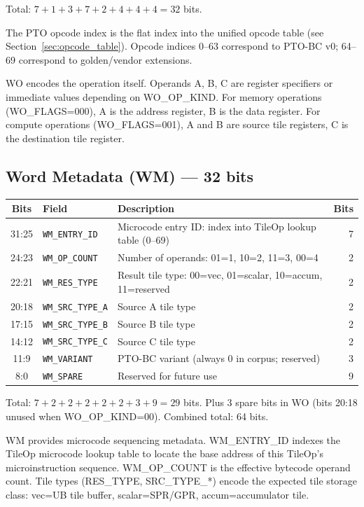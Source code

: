 Total: $7+1+3+7+2+4+4+4 = 32$ bits.

The PTO opcode index is the flat index into the unified opcode table (see Section~\ref{sec:opcode_table}). Opcode indices 0--63 correspond to PTO-BC v0; 64--69 correspond to golden/vendor extensions.

WO encodes the operation itself. Operands A, B, C are register specifiers or immediate values depending on WO\_OP\_KIND. For memory operations (WO\_FLAGS=000), A is the address register, B is the data register. For compute operations (WO\_FLAGS=001), A and B are source tile registers, C is the destination tile register.

\subsection{Word Metadata (WM) --- 32 bits}

\begin{center}
\begin{tabular}{cllr}
\toprule
Bits & Field & Description & Bits \\
\midrule
31:25 & \texttt{WM\_ENTRY\_ID} & Microcode entry ID: index into TileOp lookup table (0--69) & 7 \\
24:23 & \texttt{WM\_OP\_COUNT} & Number of operands: 01=1, 10=2, 11=3, 00=4 & 2 \\
22:21 & \texttt{WM\_RES\_TYPE} & Result tile type: 00=vec, 01=scalar, 10=accum, 11=reserved & 2 \\
20:18 & \texttt{WM\_SRC\_TYPE\_A} & Source A tile type & 2 \\
17:15 & \texttt{WM\_SRC\_TYPE\_B} & Source B tile type & 2 \\
14:12 & \texttt{WM\_SRC\_TYPE\_C} & Source C tile type & 2 \\
11:9 & \texttt{WM\_VARIANT} & PTO-BC variant (always 0 in corpus; reserved) & 3 \\
8:0 & \texttt{WM\_SPARE} & Reserved for future use & 9 \\
\bottomrule
\end{tabular}
\end{center}

Total: $7+2+2+2+2+2+3+9 = 29$ bits. Plus 3 spare bits in WO (bits 20:18 unused when WO\_OP\_KIND=00). Combined total: 64 bits.

WM provides microcode sequencing metadata. WM\_ENTRY\_ID indexes the TileOp microcode lookup table to locate the base address of this TileOp's microinstruction sequence. WM\_OP\_COUNT is the effective bytecode operand count. Tile types (RES\_TYPE, SRC\_TYPE\_*) encode the expected tile storage class: vec=UB tile buffer, scalar=SPR/GPR, accum=accumulator tile.

